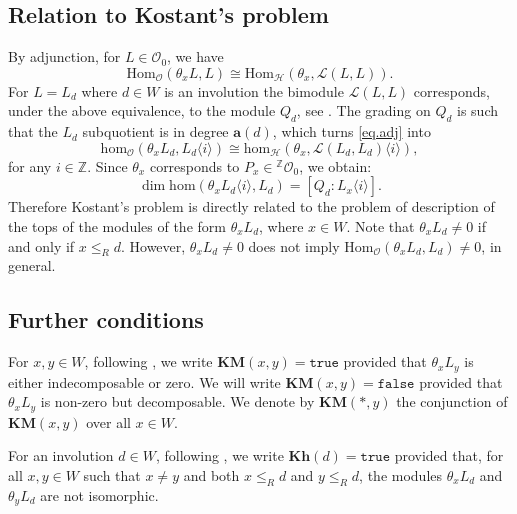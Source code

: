 \documentclass[a4paper]{amsart}
\begin{document}
\subsection{Relation to Kostant's problem}\label{s3.4}

By adjunction, for $L\in\mathcal{O}_0$, we have 
\begin{equation}\label{eq.adj}
\mathrm{Hom}_{\mathcal{O}}(\theta_x L, L)\cong
\mathrm{Hom}_{\mathcal{H}}(\theta_x,\mathcal{L}(L,L)).
\end{equation}
For $L=L_d$ where $d\in W$ is an involution the bimodule $\mathcal{L}(L,L)$
corresponds, under the above equivalence, to the module $Q_d$,
see \cite[Section~7]{KMM}. The grading on $Q_d$ is such that 
the $L_d$ subquotient is in degree $\mathbf{a}(d)$, which turns
\eqref{eq.adj} into
\begin{displaymath}
\mathrm{hom}_{\mathcal{O}}(\theta_x L_d, L_d \langle i\rangle)\cong
\mathrm{hom}_{\mathcal{H}}(\theta_x,\mathcal{L}(L_d,L_d)\langle i\rangle),
\end{displaymath}
for any $i\in\mathbb{Z}$.
Since $\theta_x$ corresponds to $P_x\in {}^\mathbb{Z}\mathcal O_0$, we obtain:
\begin{equation}\label{eq.Qd}
    \dim \mathrm{hom}(\theta_x L_d\langle i\rangle, L_d) = [Q_d: L_x\langle i\rangle].
\end{equation}
Therefore Kostant's problem is directly related to the problem of
description of the tops of the modules of the form
$\theta_x L_d$, where $x\in W$. Note that 
$\theta_x L_d\neq 0$ if and only if $x\leq_R d$.
However, $\theta_x L_d\neq 0$ does not imply
$\mathrm{Hom}_{\mathcal{O}}(\theta_x L_d, L_d)\neq 0$, in general.

\subsection{Further conditions}\label{s3.5}

For $x,y\in W$, following \cite{KiM}, 
we write $\mathbf{KM}(x,y)=\mathtt{true}$ provided that 
$\theta_x L_y$ is either indecomposable or zero.
We will write $\mathbf{KM}(x,y)=\mathtt{false}$ provided that 
$\theta_x L_y$ is non-zero but decomposable.
We denote by $\mathbf{KM}(*,y)$ the conjunction of
$\mathbf{KM}(x,y)$ over all $x\in W$.

For an involution $d\in W$, following \cite{KMM}, 
we write $\mathbf{Kh}(d)=\mathtt{true}$ provided that,
for all $x,y\in W$ such that $x\neq y$
and both $x\leq_R d$ and $y\leq_R d$, the modules
$\theta_x L_d$ and $\theta_y L_d$ are not isomorphic.
\end{document}
